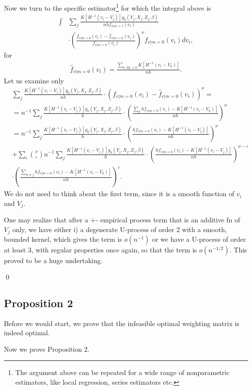 \documentclass{article}
\theoremstyle{definition}
\theoremstyle{remark}
\begin{document}
Now we turn to the specific estimator\footnote{The argument above can be repeated for a wide range of nonparametric estimators, like local regression, series estimators etc.} for which the integral above is
\begin{align} \label{eq_corKernelLastBigAlgebra}
\int &\sum_j \frac{K[H^{-1}(v_i-V_j)]g_0(Y_j, X_j, Z_j, \beta)}{nh f_{v|m=1}(v_i)} \\
 &\cdot \left(\frac{f_{v|m=0}(v_i)-\hat{f}_{v|m=0}(v_i)}{f_{v|m=0}(v_i)}\right)^\nu f_{v|m=0}(v_i) dv_i, \nonumber
\end{align}
for
\begin{align}
\hat{f}_{v|m=0}(v_i) = \frac{\sum_{k: M_k=0} K[H^{-1}(v_i-V_k)]}{nh}.
\end{align}
Let us examine only
\begin{align}
&\sum_j \frac{K[H^{-1}(v_i-V_j)]g_0(Y_j, X_j, Z_j, \beta)}{nh}\cdot \left(f_{v|m=0}(v_i)-\hat{f}_{v|m=0}(v_i)\right)^\nu = \\
&=n^{-1} \sum_j \frac{K[H^{-1}(v_i-V_j)]g_0(Y_j, X_j, Z_j, \beta)}{h}\cdot \left(\frac{\sum_{k} h f_{v|m=0}(v_i)-K[H^{-1}(v_i-V_k)]}{nh}\right)^\nu \nonumber \\
&= n^{-1} \sum_j \frac{K[H^{-1}(v_i-V_j)]g_0(Y_j, X_j, Z_j, \beta)}{h}\cdot \left(\frac{h f_{v|m=0}(v_i)-K[H^{-1}(v_i-V_j)]}{nh}\right)^\nu \nonumber\\
&+ \sum_\iota {\nu \choose \iota}  n^{-1} \sum_j \frac{K[H^{-1}(v_i-V_j)]g_0(Y_j, X_j, Z_j, \beta)}{h}\cdot \left(\frac{h f_{v|m=0}(v_i)-K[H^{-1}(v_i-V_j)]}{nh}\right)^{\nu-\iota} \nonumber \\
&\cdot \left(\frac{\sum_{k\neq j} h f_{v|m=0}(v_i)-K[H^{-1}(v_i-V_k)]}{nh}\right)^\iota. \nonumber
\end{align}
We do not need to think about the first term, since it is a smooth function of $v_i$ and $V_j$. 

One may realize that after a +- empirical process term that is an additive fn of $V_j$ only, we have either i) a degenerate U-process of order 2 with a smooth, bounded kernel, which gives the term is $o(n^{-1})$ or we have a U-process of order at least 3, with regular properties once again, so that the term is $o(n^{-1/2})$. This proved to be a huge undertaking.

\qed

\subsection{Proposition 2}
Before we would start, we prove that the infeasible optimal weighting matrix is indeed optimal.





Now we prove Proposition 2.
\end{document}
